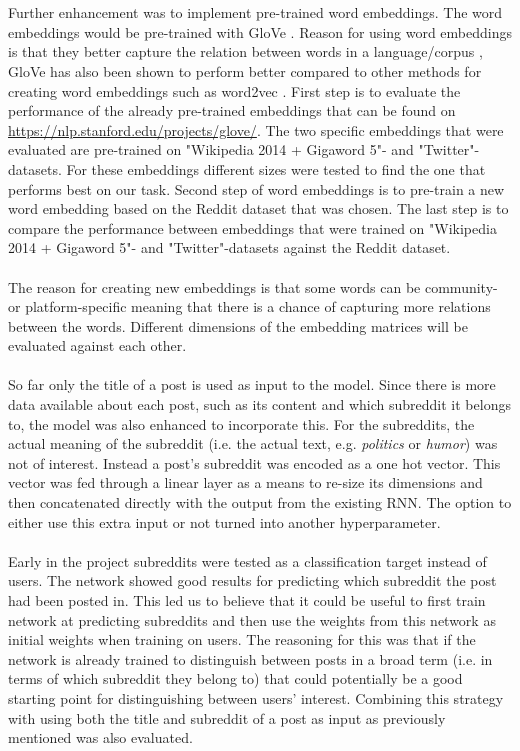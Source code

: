 \\\\
Further enhancement was to implement pre-trained word embeddings. The word embeddings would be pre-trained with GloVe \parencite{pennington2014glove}. Reason for using word embeddings is that they better capture the relation between words in a language/corpus \parencite{mikolov2013linguistic}, GloVe has also been shown to perform better compared to other methods for creating word embeddings such as word2vec \parencite{pennington2014glove}. First step is to evaluate the performance of the already pre-trained embeddings that can be found on \url{https://nlp.stanford.edu/projects/glove/}. The two specific embeddings that were evaluated are pre-trained on "Wikipedia 2014 + Gigaword 5"- and "Twitter"-datasets. For these embeddings different sizes were tested to find the one that performs best on our task. Second step of word embeddings is to pre-train a new word embedding based on the Reddit dataset that was chosen. The last step is to compare the performance between embeddings that were trained on "Wikipedia 2014 + Gigaword 5"- and "Twitter"-datasets against the Reddit dataset. 
\\\\
The reason for creating new embeddings is that some words can be community- or platform-specific meaning that there is a chance of capturing more relations between the words. Different dimensions of the embedding matrices will be evaluated against each other. 
\\\\
So far only the title of a post is used as input to the model. Since there is more data available about each post, such as its content and which subreddit it belongs to, the model was also enhanced to incorporate this. For the subreddits, the actual meaning of the subreddit (i.e. the actual text, e.g. \textit{politics} or \textit{humor}) was not of interest. Instead a post's subreddit was encoded as a one hot vector. This vector was fed through a linear layer as a means to re-size its dimensions and then concatenated directly with the output from the existing RNN. The option to either use this extra input or not turned into another hyperparameter.
\\\\
Early in the project subreddits were tested as a classification target instead of users. The network showed good results for predicting which subreddit the post had been posted in. This led us to believe that it could be useful to first train network at predicting subreddits and then use the weights from this network as initial weights when training on users. The reasoning for this was that if the network is already trained to distinguish between posts in a broad term (i.e. in terms of which subreddit they belong to) that could potentially be a good starting point for distinguishing between users' interest. Combining this strategy with using both the title and subreddit of a post as input as previously mentioned was also evaluated.

